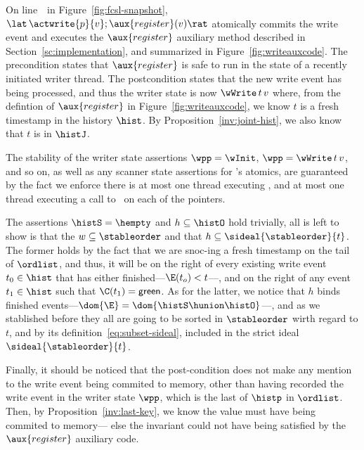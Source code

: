 On line~\lineWrtWrt~in Figure~\ref{fig:fcsl-snapshot},
$\lat\,\actwrite{p}{v}; \aux{register}(v)\rat$ atomically commits the
write event and executes the $\aux{register}$ auxiliary method
described in Section~\ref{sc:implementation}, and summarized in
Figure~\ref{fig:writeauxcode}. The precondition states that
$\aux{register}$ is safe to run in the state of a recently initiated
writer thread. The postcondition states that the new write event has
being processed, and thus the writer state is now $\wWrite\, t\, v$
where, from the defintion of $\aux{register}$ in
Figure~\ref{fig:writeauxcode}, we know $t$ is a fresh timestamp in the
history $\hist$. By Proposition~\ref{inv:joint-hist}, we also know
that $t$ is in $\histJ$.


The stability of the writer state assertions $\wpp = \wInit$, $\wpp
= \wWrite\, t\, v$, and so on, as well as any scanner state assertions
for \jyscan's atomics, are guaranteed by the fact we enforce there is
at most one thread executing \jyscan, and at most one thread executing
a call to \jywrite~on each of the pointers.
%

The assertions $\histS = \hempty$ and $h \subseteq \histO$ hold
trivially, all is left to show is that the $ w \subseteq \stableorder$
and that $h \subseteq \sideal{\stableorder}{t}$. The former holds by
the fact that we are snoc-ing a fresh timestamp on the tail of
$\ordlist$, and thus, it will be on the right of every existing write
event $t_0 \in \hist$ that has either finished---$\E(t_o) < t$---, and
on the right of any event $t_1 \in \hist$ such that $\C(t_1)
= \mathsf{green}$. As for the latter, we notice that $h$ binds
finished events---$\dom{\E} = \dom{\histS \hunion \histO}$---, and as
we stablished before they all are going to be sorted in $\stableorder$
wirth regard to $t$, and by its definition~\eqref{eq:subset-sideal},
included in the strict ideal $\sideal{\stableorder}{t}$.

Finally, it should be noticed that the post-condition does not make
any mention to the write event being commited to memory, other than
having recorded the write event in the writer state $\wpp$, which is
the last of $\histp$ in $\ordlist$. Then, by
Proposition~\ref{inv:last-key}, we know the value must have being
commited to memory--- else the invariant could not have being
satisfied by the $\aux{register}$ auxiliary code.

